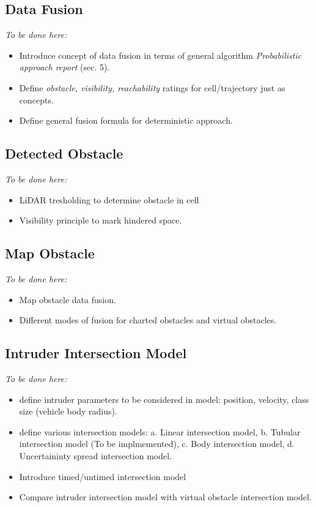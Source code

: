 \subsection{Data Fusion}\label{s:DataFusion}
    \emph{To be done here:}
    \begin{itemize}
        \item Introduce concept of data fusion in terms of general algorithm \emph{Probabilistic approach report} (sec. 5).
        \item Define \emph{obstacle, visibility, reachability} ratings for cell/trajectory just as concepts.
        \item Define general fusion formula for deterministic approach.
    \end{itemize}
    
\subsection{Detected Obstacle}\label{s:DetectedObstacle}
    \emph{To be done here:}
    \begin{itemize}
        \item LiDAR tresholding to determine obstacle in cell
        \item Visibility principle to mark hindered space.
    \end{itemize}

\subsection{Map Obstacle}\label{s:Map Obstacle}
    \emph{To be done here:}
    \begin{itemize}
        \item Map obstacle data fusion.
        \item Different modes of fusion for charted obstacles and virtual obstacles.
    \end{itemize}

\subsection{Intruder Intersection Model}\label{s:IntruderIntersectionModel}
    \emph{To be done here:}
    \begin{itemize}
        \item define intruder parameters to be considered in model: position, velocity, class size (vehicle body radius).
        \item define various intersection models: a. Linear intersection model, b. Tubular intersection model (To be implmemented), c. Body intersection model, d. Uncertaininty spread intersection model.
        \item Introduce timed/untimed intersection model
        \item Compare intruder intersection model with virtual obstacle intersection model. 
    \end{itemize}
    
